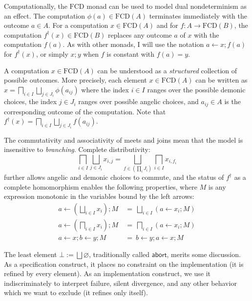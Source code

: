 \documentclass[11pt,oneside]{book}
\theoremstyle{definition}
\newcommand{\kw}[1]{\ensuremath{ \mathsf{#1} }}
\begin{document}
Computationally,
the $\mathrm{FCD}$ monad can be used to model
dual nondeterminism as an effect.
The computation
$\phi(a) \in \mathrm{FCD}(A)$
terminates immediately with the outcome $a \in A$.
For a computation $x \in \mathrm{FCD}(A)$
and for $f : A \rightarrow \mathrm{FCD}(B)$,
the computation $f^\dagger(x) \in \mathrm{FCD}(B)$
replaces
any outcome $a$ of $x$ with the computation $f(a)$.
As with other monads,
I will use the notation
$a \leftarrow x ; f(a)$ for $f^\dagger(x)$,
or simply $x ; y$ when $f$ is constant with $f(a) = y$.

A computation $x \in \mathrm{FCD}(A)$
can be understood as
a \emph{structured} collection of possible outcomes.
More precisely,
each element $x \in \mathrm{FCD}(A)$ can be written as
$
    x = \bigsqcap_{i \in I} \bigsqcup_{j \in J_i} \phi(a_{ij})
$
where
the index $i \in I$ ranges over the possible demonic choices,
the index $j \in J_i$ ranges over possible angelic choices,
and $a_{ij} \in A$ is the corresponding outcome of the computation.
Note that
$f^\dagger(x) = \bigsqcap_{i \in I} \bigsqcup_{j \in J_i} f(a_{ij})$.

The commutativity and associativity of meets and joins
mean that the model is insensitive to \emph{branching}.
Complete distributivity:
\[
    \bigsqcap_{i \in I} \bigsqcup_{j \in J_i} x_{i,j} =
    \bigsqcup_{f \in (\prod_i J_i)} \bigsqcap_{i \in I} x_{i, f_i}
\]
further allows angelic and demonic choices to commute,
and the status of $f^\dagger$ as a complete homomorphism
enables the following properties,
where $M$ is any expression monotonic in the variables
bound by the left arrows:
\begin{align*}
    a \leftarrow \left( \bigsqcup_{i \in I} x_i \right) \mathbin{;} M \: &= \:
      \bigsqcup_{i \in I} (a \leftarrow x_i \mathbin{;} M)
    \\
    a \leftarrow \left( \bigsqcap_{i \in I} x_i \right) \mathbin{;} M \: &= \:
      \bigsqcap_{i \in I} (a \leftarrow x_i \mathbin{;} M)
    \\
    a \leftarrow x \mathbin{;} b \leftarrow y \mathbin{;} M \: &= \:
    b \leftarrow y \mathbin{;} a \leftarrow x \mathbin{;} M
\end{align*}

The least element $\bot := \bigsqcup \varnothing$,
traditionally called $\kw{abort}$,
merits some discussion.
As a specification construct,
it places no constraint on the implementation
(it is refined by every element).
As an implementation construct,
we use it indiscriminately to interpret
failure, silent divergence,
and any other behavior
which we want to exclude (it refines only itself).
\end{document}
